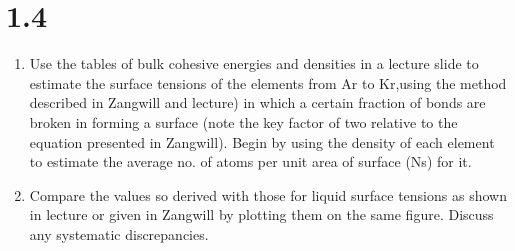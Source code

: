 \documentclass[12pt]{article}
\renewcommand{\=}[1]{\stackrel{#1}{=}} %
\theoremstyle{definition}
\theoremstyle{remark}
\begin{document}


\newpage
\section*{1.4}
\begin{bclogo}[logo=\bcquestion , barre=none]
\newline
\begin{enumerate}
\item Use the tables of bulk cohesive energies and densities in a lecture slide to estimate the surface tensions of the elements from Ar to Kr,using the method described in Zangwill and lecture) in which a certain fraction of bonds are broken in forming a surface (note the key factor of two relative to the equation presented in Zangwill). Begin by using the density of each element to estimate the average no. of atoms per unit area of surface (Ns) for it.

\item Compare the values so derived with those for liquid surface tensions as shown in lecture or given in Zangwill by plotting them on the same figure. Discuss any systematic discrepancies.
\end{enumerate}

\end{bclogo}
\vspace{2cm}





\newpage
\end{document}
